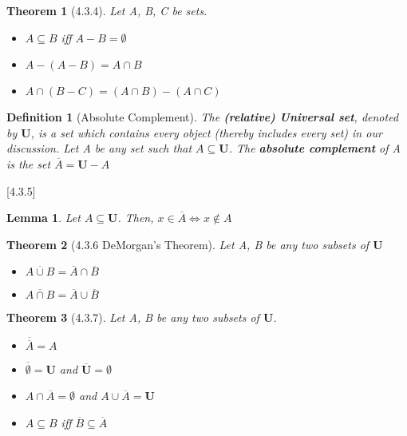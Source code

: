 \documentclass[12pt, letterpaper]{article}
\theoremstyle{plain}
\newtheorem*{theorem*}{Theorem}
\newtheorem*{lemma*}{Lemma}
\newtheorem*{definition*}{Definition}
\begin{document}
    \begin{mdframed}[leftmargin=0.01cm, rightmargin=0.01cm]
        \begin{theorem*}[4.3.4]
            Let A, B, C be sets.
            \begin{itemize}
                \item[(i)] $A \subseteq B$ iff $A - B = \emptyset$
                \item[(ii)] $A - (A - B) = A \cap B$
                \item[(iii)] $A \cap (B - C) = (A \cap B) - (A \cap C)$
            \end{itemize}
        \end{theorem*}
        \begin{definition*}[Absolute Complement]
            The \textbf{(relative) Universal set}, denoted by $\mathbf{U}$, is a set which contains every object (thereby includes every set) in our discussion. Let A be any set
            such that $A \subseteq \mathbf{U}$. The \textbf{absolute complement} of A is the set $\overline{A} = \mathbf{U} - A$
        \end{definition*}[4.3.5]
        \begin{lemma*}
            Let $A \subseteq \mathbf{U}$. Then, $x \in \overline{A} \Leftrightarrow x \notin A$
        \end{lemma*}
        \begin{theorem*}[4.3.6 DeMorgan's Theorem]
            Let A, B be any two subsets of $\mathbf{U}$
            \begin{itemize}
                \item[(i)] $\overline{A \cup B} = \overline{A} \cap \overline{B}$
                \item[(ii)] $\overline{A \cap B} = \overline{A} \cup \overline{B}$
            \end{itemize}
        \end{theorem*}
        \begin{theorem*}[4.3.7]
            Let A, B be any two subsets of $\mathbf{U}$.
            \begin{itemize}
                \item[(i)] $\overline{\overline{A}} = A$
                \item[(ii)] $\overline{\emptyset} = \mathbf{U}$ and $\overline{\mathbf{U}} = \emptyset$
                \item[(iii)] $A \cap \overline{A} = \emptyset$ and $A \cup \overline{A} = \mathbf{U}$
                \item[(iv)] $A \subseteq B$ iff $\overline{B} \subseteq \overline{A}$

\end{itemize}
\end{theorem*}
\end{mdframed}
\end{document}
